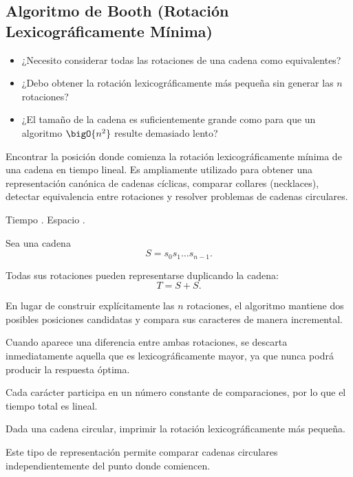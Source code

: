 \subsection{Algoritmo de Booth (Rotación Lexicográficamente Mínima)}


\begin{itemize}
\item ¿Necesito considerar todas las rotaciones de una cadena como equivalentes?
\item ¿Debo obtener la rotación lexicográficamente más pequeña sin generar las \(n\) rotaciones?
\item ¿El tamaño de la cadena es suficientemente grande como para que un algoritmo \(\bigO{n^2}\) resulte demasiado lento?
\end{itemize}


Encontrar la posición donde comienza la rotación lexicográficamente mínima de una cadena en tiempo lineal. Es ampliamente utilizado para obtener una representación canónica de cadenas cíclicas, comparar collares (necklaces), detectar equivalencia entre rotaciones y resolver problemas de cadenas circulares.


Tiempo . Espacio .


Sea una cadena
\[
S=s_0s_1\dots s_{n-1}.
\]

Todas sus rotaciones pueden representarse duplicando la cadena:
\[
T=S+S.
\]

En lugar de construir explícitamente las \(n\) rotaciones, el algoritmo mantiene dos posibles posiciones candidatas y compara sus caracteres de manera incremental.

Cuando aparece una diferencia entre ambas rotaciones, se descarta inmediatamente aquella que es lexicográficamente mayor, ya que nunca podrá producir la respuesta óptima.

Cada carácter participa en un número constante de comparaciones, por lo que el tiempo total es lineal.


Dada una cadena circular, imprimir la rotación lexicográficamente más pequeña.

Este tipo de representación permite comparar cadenas circulares independientemente del punto donde comiencen.


